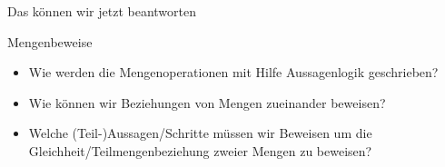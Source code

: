 \begin{frame}[fragile]{Das können wir jetzt beantworten}
    \begin{alertblock}{Mengenbeweise}
        \begin{itemize}
            \item Wie werden die Mengenoperationen mit Hilfe Aussagenlogik geschrieben?
            \item Wie können wir Beziehungen von Mengen zueinander beweisen?
            \item Welche (Teil-)Aussagen/Schritte müssen wir Beweisen um die Gleichheit/Teilmengenbeziehung zweier Mengen zu beweisen?
        \end{itemize}
    \end{alertblock}
\end{frame}